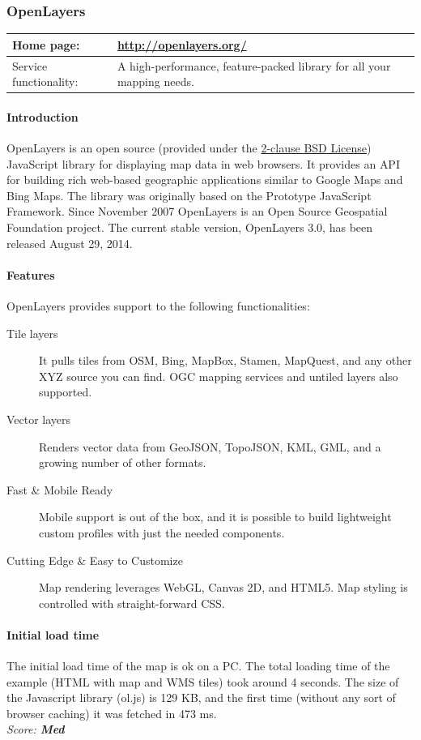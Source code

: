 \documentclass[11pt,a4paper,titlepage,oneside]{report}
\begin{document}
  \subsubsection{OpenLayers}
   \begin{tabular}{|p{4cm}|p{8cm}|}
     \hline
     Home page: & \url{http://openlayers.org/} \\
     \hline
     Service functionality: & A high-performance, feature-packed library for all your mapping needs. \\
     \hline
   \end{tabular}
   \paragraph{Introduction} \indent
   OpenLayers is an \gls{open source} (provided under the \href{'https://tldrlegal.com/license/bsd-2-clause-license-(freebsd)'}{2-clause \gls{BSD} License}) JavaScript library for displaying map data in web browsers. It provides an \gls{API} for building rich web-based geographic applications similar to Google Maps and Bing Maps. The library was originally based on the Prototype JavaScript Framework. Since November 2007 OpenLayers is an Open Source Geospatial Foundation project.
   The current stable version, OpenLayers 3.0, has been released August 29, 2014.
   \paragraph{Features}
   OpenLayers provides support to the following functionalities:
   \begin{description}
     \item[Tile layers] It pulls tiles from OSM, Bing, MapBox, Stamen, MapQuest, and any other XYZ source you can find. \gls{OGC} mapping services and untiled layers also supported.
     \item[Vector layers] Renders vector data from GeoJSON, TopoJSON, KML, GML, and a growing number of other formats.
     \item[Fast \& Mobile Ready] Mobile support is out of the box, and it is possible to build lightweight custom profiles with just the needed components.
     \item[Cutting Edge \& Easy to Customize] Map rendering leverages WebGL, Canvas 2D, and \gls{HTML5}. Map styling is controlled with straight-forward \gls{CSS}.
   \end{description}
   \paragraph{Initial load time}
   The initial load time of the map is ok on a PC. The total loading time of the example (\gls{HTML} with map and \gls{WMS} tiles) took around 4 seconds. The size of the Javascript library (ol.js) is 129 KB, and the first time (without any sort of browser caching) it was fetched in 473 ms.
   \\ \emph{Score: \textbf{Med}}
\end{document}
